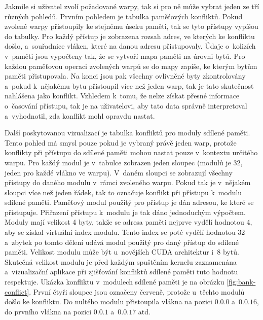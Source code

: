 Jakmile si uživatel zvolí požadované warpy, tak si pro ně může vybrat jeden ze tří různých pohledů. Prvním pohledem je tabulka paměťových konfliktů. Pokud zvolené warpy přistoupily ke stejnému úseku paměti, tak se tyto přístupy vypíšou do tabulky. Pro každý přístup je zobrazena rozsah adres, ve kterých ke konfliktu došlo, a~souřadnice vláken, které na danou adresu přistupovaly. Údaje o~kolizích v~paměti jsou vypočteny tak, že se vytvoří mapa paměti na úrovni bytů. Pro každou paměťovou operaci zvolených warpů se do mapy zapíše, ke kterým bytům paměti přistupovala. Na konci jsou pak všechny ovlivněné byty zkontrolovány a~pokud k~nějakému bytu přistoupil více než jeden warp, tak je tato skutečnost nahlášena jako konflikt. Vzhledem k~tomu, že nelze získat přesné informace o~časování přístupu, tak je na uživatelovi, aby tato data správně interpretoval a~vyhodnotil, zda konflikt mohl opravdu nastat.

Další poskytovanou vizualizací je tabulka konfliktů pro moduly sdílené paměti. Tento pohled má smysl pouze pokud je vybraný právě jeden warp, protože konflikty při přístupu do sdílené paměti mohou nastat pouze v~kontextu určitého warpu. Pro každý modul je v~tabulce zobrazen jeden sloupec (modulů je 32, jeden pro každé vlákno ve warpu). V~daném sloupci se zobrazují všechny přístupy do daného modulu v~rámci zvoleného warpu. Pokud tak je v~nějakém sloupci více než jeden řádek, tak to označuje konflikt při přístupu k~modulu sdílené paměti. Paměťový modul použitý pro přístup je dán adresou, ke které se přistupuje. Přiřazení přístupu k~modulu je tak dáno jednoduchým výpočtem. Moduly mají velikost 4 byty, takže se adresa paměti nejprve vydělí hodnotou 4, aby se získal virtuální index modulu. Tento index se poté vydělí hodnotou 32 a~zbytek po tomto dělení udává modul použitý pro daný přístup do sdílené paměti. Velikost modulu může být u~novějších CUDA architektur i~8 bytů. Skutečná velikost modulu je před každým spuštěním kernelu zaznamenána a~vizualizační aplikace při zjišťování konfliktů sdílené paměti tuto hodnotu respektuje. Ukázka konfliktu v~modulech sdílené paměti je na obrázku \ref{fig:bank-conflict}. První čtyři sloupce jsou označeny červeně, protože u~těchto modulů došlo ke konfliktu. Do nultého modulu přistoupila vlákna na pozici $0.0.0$ a~$0.0.16$, do prvního vlákna na pozici $0.0.1$ a~$0.0.17$ atd.



